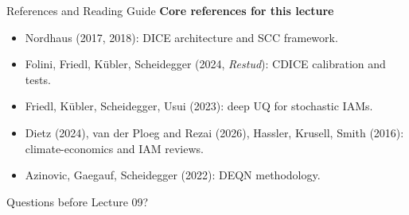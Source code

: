 \documentclass[aspectratio=169,11pt]{beamer}
\newcommand{\emphc}[1]{\textcolor{harvardcrimson}{#1}}
\begin{document}
\begin{frame}{References and Reading Guide}
\small
\textbf{Core references for this lecture}
\begin{itemize}
    \item Nordhaus (2017, 2018): DICE architecture and SCC framework.
    \item Folini, Friedl, K\"ubler, Scheidegger (2024, \textit{Restud}): CDICE calibration and tests.
    \item Friedl, K\"ubler, Scheidegger, Usui (2023): deep UQ for stochastic IAMs.
    \item Dietz (2024), van der Ploeg and Rezai (2026), Hassler, Krusell, Smith (2016): climate-economics and IAM reviews.
    \item Azinovic, Gaegauf, Scheidegger (2022): DEQN methodology.
\end{itemize}

\vspace{0.3cm}
\begin{center}
{\LARGE \emphc{Questions before Lecture 09?}}
\end{center}
\end{frame}
\end{document}
